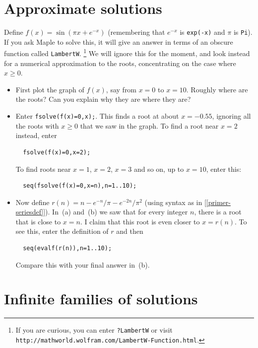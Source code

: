 \documentclass[a4paper,10pt]{amsbook}
\begin{document}
\section{Approximate solutions}

\begin{exercise}\label{ex-adjusted-sin}
 Define $f(x)=\sin(\pi x+e^{-x})$ (remembering that $e^{-x}$ is
 \verb~exp(-x)~ and $\pi$ is \verb~Pi~).  If you ask Maple to solve
 this, it will give an answer in terms of an obscure function called
 \verb~LambertW~.  \footnote{If you are curious, you can enter
   \verb~?LambertW~ or visit
   \verb~http://mathworld.wolfram.com/LambertW-Function.html~.} 
 We will ignore this for the moment, and look instead for a numerical
 approximation to the roots, concentrating on the case where
 $x\geq 0$.
 \begin{itemize}
  \item[(a)] First plot the graph of $f(x)$, say from $x=0$ to $x=10$. 
   Roughly where are the roots?  Can you explain why they are where
   they are? 
  \item[(b)] Enter \verb~fsolve(f(x)=0,x);~.  This finds a root at
   about $x=-0.55$, ignoring all the roots with $x\geq 0$ that we saw
   in the graph.  To find a root near $x=2$ instead, enter
\begin{verbatim}
  fsolve(f(x)=0,x=2);
\end{verbatim}
   To find roots near $x=1$, $x=2$, $x=3$ and so on, up to $x=10$,
   enter this:
\begin{verbatim}
  seq(fsolve(f(x)=0,x=n),n=1..10);
\end{verbatim}
  \item[(c)] Now define $r(n)=n-e^{-n}/\pi-e^{-2n}/\pi^2$
   (using syntax as in [\ref{primer-seriesdef}]).  In~(a)
   and~(b) we saw that for every integer $n$, there is a root that is
   close to $x=n$.  I claim that this root is even closer to
   $x=r(n)$.  To see this, enter the definition of $r$ and then 
\begin{verbatim}
  seq(evalf(r(n)),n=1..10);
\end{verbatim}
   Compare this with your final answer in~(b). 
 \end{itemize}
\end{exercise}

\section{Infinite families of solutions}
\end{document}
